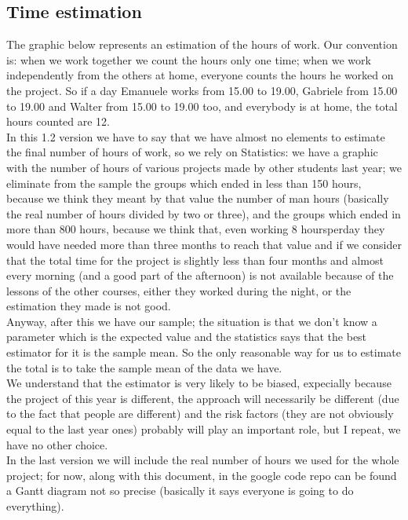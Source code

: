 \documentclass[a4paper,12pt]{article}
\begin{document}
\subsection{Time estimation}
The graphic below represents an estimation of the hours of work. Our convention is: when we work together we count the hours only one time; when we work independently from the others at home, everyone counts the hours he worked on the project. So if a day Emanuele works from 15.00 to 19.00, Gabriele from 15.00 to 19.00 and Walter from 15.00 to 19.00 too, and everybody is at home, the total hours counted are 12.\\[1\baselineskip]In this 1.2 version we have to say that we have almost no elements to estimate the final number of hours of work, so we rely on Statistics: we have a graphic with the number of hours of various projects made by other students last year; we eliminate from the sample the groups which ended in less than 150 hours, because we think they meant by that value the number of man hours (basically the real number of hours divided by two or three), and the groups which ended in more than 800 hours, because we think that, even working 8 hoursperday they would have needed more than three months to reach that value and if we consider that the total time for the project is slightly less than four months and almost every morning (and a good part of the afternoon) is not available because of the lessons of the other courses, either they worked during the night, or the estimation they made is not good.\\[1\baselineskip]Anyway, after this we have our sample; the situation is that we don’t know a parameter which is the expected value and the statistics says that the best estimator for it is the sample mean. So the only reasonable way for us to estimate the total is to take the sample mean of the data we have.\\[1\baselineskip]We understand that the estimator is very likely to be biased, expecially because the project of this year is different, the approach will necessarily be different (due to the fact that people are different) and the risk factors (they are not obviously equal to the last year ones) probably will play an important role, but I repeat, we have no other choice.\\[1\baselineskip]In the last version we will include the real number of hours we used for the whole project; for now, along with this document, in the google code repo can be found a Gantt diagram not so precise (basically it says everyone is going to do everything).
\end{document}
